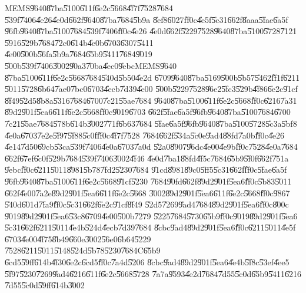MEMS\U{9640}\U{87ba}\U{5100}\U{611f}\U{6e2c}\U{5668}\U{4f7f}\U{7528}\U{7684}%
\U{539f}\U{7406}\U{4e26}\U{4e0d}\U{662f}\U{9640}\U{87ba}\U{7684}\U{5b9a}%
\U{8ef8}\U{6027}\U{ff0c}\U{4e5f}\U{5c31}\U{662f}\U{8aaa}\U{5fae}\U{6a5f}%
\U{96fb}\U{9640}\U{87ba}\U{5100}\U{7684}\U{539f}\U{7406}\U{ff0c}\U{4e26}%
\U{4e0d}\U{662f}\U{5229}\U{7528}\U{9640}\U{87ba}\U{5100}\U{5728}\U{7121}%
\U{5916}\U{529b}\U{7684}\U{72c0}\U{614b}\U{4e0b}\U{6703}\U{6307}\U{5411}%
\U{4e00}\U{500b}\U{56fa}\U{5b9a}\U{7684}\U{65b9}\U{5411}\U{7684}\U{9019}%
\U{500b}\U{539f}\U{7406}\U{3002}\U{90a3}\U{70ba}\U{4ec0}\U{9ebc}MEMS\U{9640}%
\U{87ba}\U{5100}\U{611f}\U{6e2c}\U{5668}\U{7684}\U{540d}\U{5b50}\U{4e2d}%
\U{6709}\U{9640}\U{87ba}\U{5169}\U{500b}\U{5b57}\U{5462}\U{ff1f}\U{6211}%
\U{5011}\U{5728}\U{6b64}\U{7ae0}\U{7bc0}\U{6703}\U{4ecb}\U{7d39}\U{4e00}%
\U{500b}\U{5229}\U{7528}\U{96e2}\U{5fc3}\U{529b}\U{4f86}\U{6e2c}\U{91cf}%
\U{8f49}\U{52d5}\U{8b8a}\U{5316}\U{7684}\U{6700}\U{7c21}\U{55ae}\U{7684}%
\U{9640}\U{87ba}\U{5100}\U{611f}\U{6e2c}\U{5668}\U{ff0c}\U{6216}\U{7a31}%
\U{89d2}\U{901f}\U{5ea6}\U{611f}\U{6e2c}\U{5668}\U{ff0c}\U{9019}\U{6703}%
\U{662f}\U{5fae}\U{6a5f}\U{96fb}\U{9640}\U{87ba}\U{5100}\U{7684}\U{6700}%
\U{7c21}\U{55ae}\U{7684}\U{578b}\U{614b}\U{3002}\U{771f}\U{6b63}\U{7684}%
\U{5fae}\U{6a5f}\U{96fb}\U{9640}\U{87ba}\U{5100}\U{5728}\U{5c3a}\U{5bf8}%
\U{4e0a}\U{6703}\U{7e2e}\U{5f97}\U{5f88}\U{5c0f}\U{ff0c}\U{4f7f}\U{7528}%
\U{7684}\U{662f}\U{534a}\U{5c0e}\U{9ad4}\U{88fd}\U{7a0b}\U{ff0c}\U{4e26}%
\U{4e14}\U{7d50}\U{69cb}\U{53ca}\U{539f}\U{7406}\U{4e0a}\U{6703}\U{7a0d}%
\U{52a0}\U{8907}\U{96dc}\U{4e00}\U{4e9b}\U{ff0c}\U{7528}\U{4e0a}\U{7684}%
\U{662f}\U{67ef}\U{6c0f}\U{529b}\U{7684}\U{539f}\U{7406}\U{3002}\U{4f46}%
\U{4e0d}\U{7ba1}\U{88fd}\U{4f5c}\U{7684}\U{65b9}\U{5f0f}\U{662f}\U{751a}%
\U{9ebc}\U{ff0c}\U{6211}\U{5011}\U{8981}\U{5b78}\U{7fd2}\U{5230}\U{7684}%
\U{91cd}\U{8981}\U{89c0}\U{5ff5}\U{5c31}\U{662f}\U{ff0c}\U{5fae}\U{6a5f}%
\U{96fb}\U{9640}\U{87ba}\U{5100}\U{611f}\U{6e2c}\U{5668}\U{91cf}\U{5230}%
\U{7684}\U{90fd}\U{662f}\U{89d2}\U{901f}\U{5ea6}\U{ff0c}\U{5b83}\U{5011}%
\U{662f}\U{4e00}\U{7a2e}\U{89d2}\U{901f}\U{5ea6}\U{611f}\U{6e2c}\U{5668}%
\U{3002}\U{89d2}\U{901f}\U{5ea6}\U{611f}\U{6e2c}\U{5668}\U{ff0c}\U{9867}%
\U{540d}\U{601d}\U{7fa9}\U{ff0c}\U{5c31}\U{662f}\U{6e2c}\U{91cf}\U{8f49}%
\U{52d5}\U{7269}\U{9ad4}\U{7684}\U{89d2}\U{901f}\U{5ea6}\U{ff0c}\U{800c}%
\U{9019}\U{89d2}\U{901f}\U{5ea6}\U{53c8}\U{6709}\U{4e00}\U{500b}\U{7279}%
\U{5225}\U{7684}\U{5730}\U{65b9}\U{ff0c}\U{9019}\U{89d2}\U{901f}\U{5ea6}%
\U{5c31}\U{662f}\U{6211}\U{5011}\U{4e4b}\U{524d}\U{4ecb}\U{7d39}\U{7684}%
\U{8cbc}\U{9ad4}\U{89d2}\U{901f}\U{5ea6}\U{ff0c}\U{6211}\U{5011}\U{4e5f}%
\U{6703}\U{4e00}\U{4f75}\U{8b49}\U{660e}\U{3002}\U{56e0}\U{6b64}\U{5229}%
\U{7528}\U{6211}\U{5011}\U{5148}\U{524d}\U{5b78}\U{5230}\U{7684}C\U{65b9}%
\U{6cd5}\U{59ff}\U{614b}\U{4f30}\U{6e2c}\U{6cd5}\U{ff0c}\U{7a4d}\U{5206}%
\U{8cbc}\U{9ad4}\U{89d2}\U{901f}\U{5ea6}\U{4e4b}\U{5f8c}\U{53ef}\U{4ee5}%
\U{5f97}\U{5230}\U{7269}\U{9ad4}\U{6216}\U{611f}\U{6e2c}\U{5668}\U{5728}%
\U{7a7a}\U{9593}\U{4e2d}\U{7684}\U{7d55}\U{5c0d}\U{65b9}\U{5411}\U{6216}%
\U{7d55}\U{5c0d}\U{59ff}\U{614b}\U{3002}


